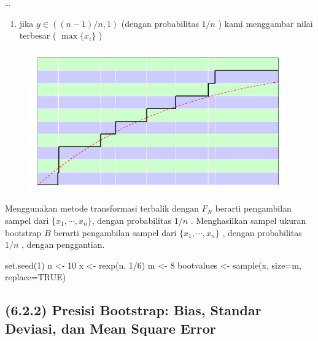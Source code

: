 \documentclass[
]{book}
\newenvironment{Shaded}{\begin{snugshade}}{\end{snugshade}}
\newcommand{\AttributeTok}[1]{\textcolor[rgb]{0.77,0.63,0.00}{#1}}
\newcommand{\ConstantTok}[1]{\textcolor[rgb]{0.00,0.00,0.00}{#1}}
\newcommand{\DecValTok}[1]{\textcolor[rgb]{0.00,0.00,0.81}{#1}}
\newcommand{\FunctionTok}[1]{\textcolor[rgb]{0.00,0.00,0.00}{#1}}
\newcommand{\NormalTok}[1]{#1}
\newcommand{\OtherTok}[1]{\textcolor[rgb]{0.56,0.35,0.01}{#1}}
\newcommand{\SpecialCharTok}[1]{\textcolor[rgb]{0.00,0.00,0.00}{#1}}
\providecommand{\tightlist}{%
  \setlength{\itemsep}{0pt}\setlength{\parskip}{0pt}}
\begin{document}
\ldots{}

\begin{enumerate}
\def\labelenumi{\arabic{enumi}.}
\setcounter{enumi}{2}
\tightlist
\item
  jika \(y\in((n-1)/n,1)\) (dengan probabilitas \(1 / n\) ) kami menggambar nilai terbesar ( \(\max\{x_i\}\) )
\end{enumerate}

\begin{figure}

{\centering \includegraphics[width=1\linewidth]{images/6.2.1-2} 

}

\end{figure}

Menggunakan metode transformasi terbalik dengan \(F_N\) berarti pengambilan sampel dari \(\{x_1,\cdots,x_n\}\), dengan probabilitas \(1 / n\) . Menghasilkan sampel ukuran bootstrap \(B\) berarti pengambilan sampel dari \(\{x_1,\cdots,x_n\}\) , dengan probabilitas \(1 / n\) , dengan penggantian.

\begin{Shaded}
\begin{Highlighting}[]
\FunctionTok{set.seed}\NormalTok{(}\DecValTok{1}\NormalTok{)}
\NormalTok{n }\OtherTok{\textless{}{-}} \DecValTok{10}
\NormalTok{x }\OtherTok{\textless{}{-}} \FunctionTok{rexp}\NormalTok{(n, }\DecValTok{1}\SpecialCharTok{/}\DecValTok{6}\NormalTok{)}
\NormalTok{m }\OtherTok{\textless{}{-}} \DecValTok{8}
\NormalTok{bootvalues }\OtherTok{\textless{}{-}} \FunctionTok{sample}\NormalTok{(x, }\AttributeTok{size=}\NormalTok{m, }\AttributeTok{replace=}\ConstantTok{TRUE}\NormalTok{)}
\end{Highlighting}
\end{Shaded}

\hypertarget{presisi-bootstrap-bias-standar-deviasi-dan-mean-square-error}{%
\subsection{(6.2.2) Presisi Bootstrap: Bias, Standar Deviasi, dan Mean Square Error}\label{presisi-bootstrap-bias-standar-deviasi-dan-mean-square-error}}
\end{document}
